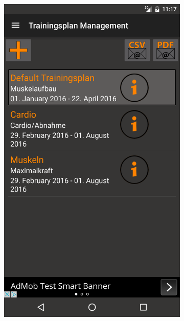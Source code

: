 \documentclass[FIPLY_base.tex]{subfiles}
\begin{document}
\begin{figure}[h]
	\begin{subfigure}[b]{0.3\textwidth}
	\includegraphics[scale=0.15]{img/adsBanner}
	\end{subfigure}
	\hfil
	\begin{subfigure}[b]{0.3\textwidth}

\end{subfigure}
\end{figure}
\end{document}
